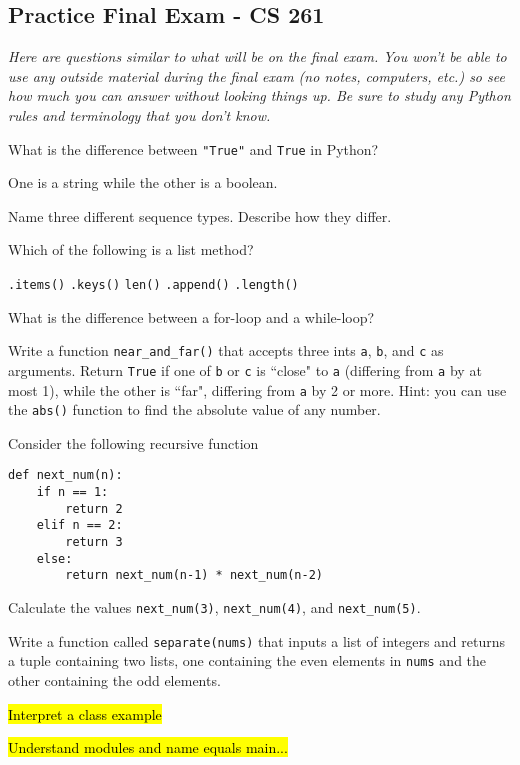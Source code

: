 \documentclass[12pt]{exam}
\begin{document}
\pagestyle{empty}
\graphicspath{{/home/brian/Dropbox/HSC/Spring16/Math111/}}

\subsection*{Practice Final Exam - CS 261}
\textit{Here are questions similar to what will be on the final exam.  You won't be able to use any outside material during the final exam (no notes, computers, etc.) so see how much you can answer without looking things up. Be sure to study any Python rules and terminology that you don't know. }

\begin{questions}

\question What is the difference between \verb|"True"| and \verb|True| in Python? 
\begin{solution}
One is a string while the other is a boolean. 
\end{solution}

\question Name three different sequence types. Describe how they differ.

\question Which of the following is a list method?
\begin{choices}
\choice \verb|.items()|
\choice \verb|.keys()|
\choice \verb|len()|
\CorrectChoice \verb|.append()|
\choice \verb|.length()|
\end{choices}

\question What is the difference between a for-loop and a while-loop?  

\question Write a function \verb|near_and_far()| that accepts three ints \verb|a|, \verb|b|, and \verb|c| as arguments. Return \verb|True| if one of \verb|b| or \verb|c| is ``close" to \verb|a| (differing from \verb|a| by at most 1), while the other is ``far", differing from \verb|a| by 2 or more. Hint: you can use the \verb|abs()| function to find the absolute value of any number.  

\question Consider the following recursive function 

\begin{verbatim}
def next_num(n):
    if n == 1:
        return 2
    elif n == 2:
        return 3
    else:
        return next_num(n-1) * next_num(n-2)
\end{verbatim}

Calculate the values \verb`next_num(3)`, \verb`next_num(4)`, and \verb`next_num(5)`.  

\question Write a function called \verb|separate(nums)| that inputs a list of integers and returns a tuple containing two lists, one containing the even elements in \verb|nums| and the other containing the odd elements.  

\question \hl{Interpret a class example}

\question \hl{Understand modules and name equals main...}

\end{questions}
\end{document}
